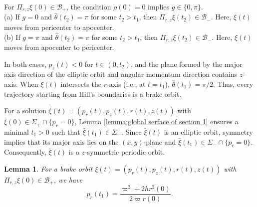\documentclass[11pt]{amsart}
\newcommand{\om}{\varpi}
\newtheorem{lemma}{Lemma}[section]
\begin{document}
For $\Pi_{r,z}\xi(0)\in\mathcal{B}_{+}$, the condition $\dot{\rho}(0)=0$ implies $ g \in \{0, \pi\} $. \\ 
(a) If $g=0$ and $\hat{\theta}(t_2)=\pi$ for some $t_2>t_1$, then
$\Pi_{r,z}\xi(t_2)\in\mathcal{B}_{-}$. Here, $ \xi(t) $ moves from pericenter to apocenter.\\  
(b) If $g=\pi$ and $\hat{\theta}(t_2)=\pi$ for some $t_2>t_1$, then $\Pi_{r,z}\xi(t_2)\in\mathcal{B}_{-}$. Here, $ \xi(t) $ moves from apocenter to pericenter. 
	
In both cases, $p_z(t)<0$ for $t\in(0,t_2)$, and the plane formed by the major axis direction of the elliptic orbit and angular momentum direction contains $z$-axis. When $\xi(t)$ intersects the $r$-axis (i.e., at $t=t_1$), $ \hat{\theta}(t_1) = \pi/2 $. Thus, every trajectory starting from Hill’s boundaries is a brake orbit.
	
For a solution $\bar{\xi}(t)=(p_{r}(t),p_{z}(t),r(t),z(t))$ with $\bar{\xi}(0)\in\Sigma_+\cap\{p_r=0\}$, Lemma \ref{lemma:global serface of section 1} ensures a minimal $t_{1}>0$ such that $\bar{\xi}(t_{1})\in\Sigma_-$. Since $\bar{\xi}(t)$ is an elliptic orbit, symmetry implies that its major axis lies on the $(x,y)$-plane and $\bar{\xi}(t_1)\in\Sigma_-\cap\{p_r=0\}$. Consequently, $\bar{\xi}(t)$ is a $z$-symmetric periodic orbit.
	
\begin{lemma}\label{lemma:relationship pr r}
	For a brake orbit $\xi(t) = (p_{r}(t), p_{z}(t), r(t), z(t))$ with $\Pi_{r,z}\xi(0)\in\mathcal{B}_+$, we have
	$$
	p_{r}(t_1) = \frac{\om^2 + 2hr^2(0)}{2\om r(0)}.
	$$
\end{lemma}
\end{document}
